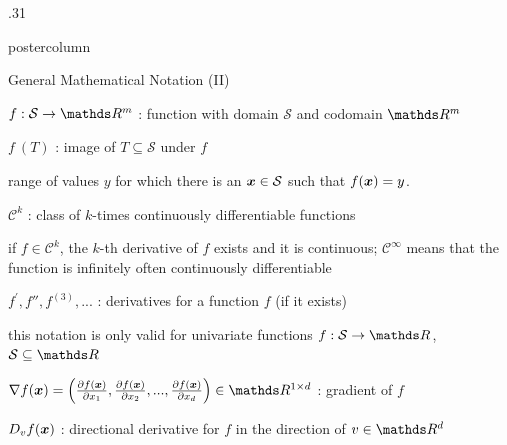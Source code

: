 \documentclass[11pt,compress,t,notes=noshow, xcolor=table]{beamer}
\begin{document}
\begin{frame}[fragile]{}
\begin{columns}
\begin{column}{.31\textwidth}
\begin{beamercolorbox}[center]{postercolumn}
\begin{minipage}{.98\textwidth}
{						\begin{myblock}{General Mathematical Notation (II)}
						\begin{codebox}
							 $f: \mathcal{S} \to \R^m$ : function with domain $\mathcal{S}$ and codomain $\R^m$
						\end{codebox}
						\hspace*{1ex}  %
						\begin{codebox}
							 $f~(T)$ : image of $T \subseteq \mathcal{S}$ under $f$
						\end{codebox}
						\hspace*{1ex} range of values $y$ for which there is an $\bm{x} \in \mathcal{S}$ such that $f(\bm{x}) = y$. \\
						\begin{codebox}
							 $\mathcal{C}^k$ : class of $k$-times continuously differentiable functions
						\end{codebox}
						\hspace*{1ex} if $f \in \mathcal{C}^k$, the $k$-th derivative of $f$ exists and it is continuous; $\mathcal{C}^\infty$ means that the function is infinitely often continuously differentiable \\
						\begin{codebox}
							 $f^\prime, f'', f^{(3)}, ...$ : derivatives for a function $f$ (if it exists)
						\end{codebox}
						\hspace*{1ex} this notation is only valid for univariate functions $f: \mathcal{S} \to \R$, $\mathcal{S} \subseteq \R$ \\
						\begin{codebox}
							 $\nabla f(\xv) = \left(\frac{\partial f(\xv)}{\partial x_1}, \frac{\partial f(\xv)}{\partial x_2}, ..., \frac{\partial f(\xv)}{\partial x_d}\right) \in \R^{1 \times d}$ : gradient of $f$
						\end{codebox}
						\hspace*{1ex} %
						\begin{codebox}
							 $D_v f(\bm{x})$ : directional derivative for $f$ in the direction of $v \in \R^d$
						\end{codebox}
						\hspace*{1ex} %

\end{myblock}}
\end{minipage}
\end{beamercolorbox}
\end{column}
\end{columns}
\end{frame}
\end{document}
